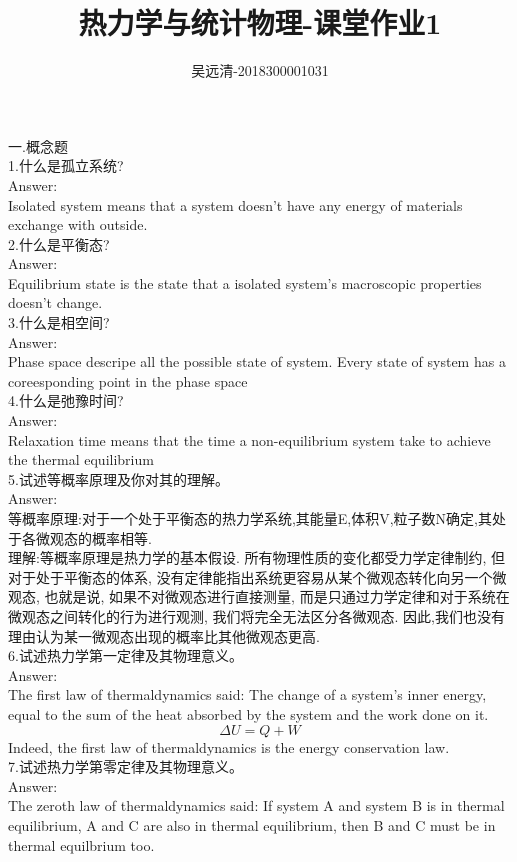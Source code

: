 \documentclass[UTF8]{ctexart}
\title{热力学与统计物理-课堂作业1}
\author{吴远清-2018300001031}
\begin{document}
	\maketitle
	一.概念题\\
	1.什么是孤立系统?\\
	Answer:\\
	Isolated system means that a system doesn't have any energy of materials exchange with outside.\\
	2.什么是平衡态?\\
	Answer:\\
	Equilibrium state is the state that a isolated system's macroscopic properties doesn't change.\\
	3.什么是相空间?\\
	Answer:\\
	Phase space descripe all the possible state of system. Every state of system has a coreesponding point in the phase space\\
	4.什么是弛豫时间?\\
	Answer:\\
	Relaxation time means that the time  a non-equilibrium system take to achieve the thermal equilibrium\\
	5.试述等概率原理及你对其的理解。\\
	Answer:\\
	等概率原理:对于一个处于平衡态的热力学系统,其能量E,体积V,粒子数N确定,其处于各微观态的概率相等.\\
	理解:等概率原理是热力学的基本假设. 所有物理性质的变化都受力学定律制约, 但对于处于平衡态的体系, 没有定律能指出系统更容易从某个微观态转化向另一个微观态, 也就是说, 如果不对微观态进行直接测量, 而是只通过力学定律和对于系统在微观态之间转化的行为进行观测, 我们将完全无法区分各微观态. 因此,我们也没有理由认为某一微观态出现的概率比其他微观态更高.\\
	6.试述热力学第一定律及其物理意义。\\
	Answer:\\
	The first law of thermaldynamics said: The change of a system's inner energy, equal to the sum of the heat absorbed by the system and the work done on it.
	$$\Delta U = Q + W$$
	Indeed, the first law of thermaldynamics is the energy conservation law.\\
	7.试述热力学第零定律及其物理意义。\\
	Answer:\\
	The zeroth law of thermaldynamics said: If system A and system B is in thermal equilibrium,  A and C are also in thermal equilibrium, then B and C must be in thermal equilbrium too.\\
\end{document}
